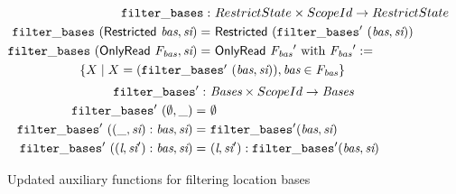 \begin{figure}[h]
    \begin{align*}
    \filterbases                                         : & \ RestrictState \times ScopeId \rightarrow RestrictState \\
    \filterbases \ (\restricted{\Basesvar}, \Scopeidvar)    = & \ \restricted{(\filterbasesrec \ (\Basesvar, \Scopeidvar))} \\
    \filterbases \ (\onlyread{\Basesfamvar}, \Scopeidvar)   = & \ \onlyread{\Basesfamvar'} \textrm{ with } \Basesfamvar' := \\
    \omit\rlap{\hspace{2cm}$\{X \mid X = (\filterbasesrec \ (\Basesvar, \Scopeidvar)), \Basesvar \in \Basesfamvar\}$}
    \end{align*}
    \begin{align*}
    \mathtt{filter\_bases'}                                             : & \ \textit{Bases} \times ScopeId \rightarrow \textit{Bases} \\
    \mathtt{filter\_bases'} \ (\emptyset, \_)                              = & \ \emptyset \\
    \mathtt{filter\_bases'} \ ((\_, \textit{si}) : \textit{bas}, \textit{si}) = & \ \mathtt{filter\_bases'} (\textit{bas}, \textit{si}) \\
    \mathtt{filter\_bases'} \ ((\textit{l}, \textit{si}') : \textit{bas}, \textit{si}) = & \ (\textit{l}, \textit{si}') : \mathtt{filter\_bases'} (\textit{bas}, \textit{si})
    \end{align*}
    \vspace{-0.8cm}
\caption{Updated auxiliary functions for filtering location bases}
\label{fig:auxiliary-bases-filtering-2}
\end{figure}

